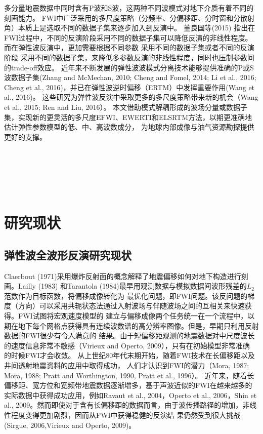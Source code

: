 多分量地震数据中同时含有P波和S波，这两种不同波模式对地下介质有着不同的刻画能力。
FWI中广泛采用的多尺度策略（分频率、分偏移距、分时窗和分散射角）本质上是选取不同的数据子集来逐步加入到反演中。
董良国等(2015)\cite{董良国2015}
指出在FWI过程中，不同的反演阶段采用不同的数据子集可以降低反演的非线性程度。而在弹性波反演中，更加需要根据不同参数
采用不同的数据子集或者不同的反演阶段
采用不同的数据子集，来降低多参数反演的非线性程度，同时也压制参数间的trade-off效应。
近年来不断发展的弹性波波模式分离技术能够提供准确的P或S波数据子集(Zhang and McMechan,
2010\cite{zhang.mcmechan:2010}; Cheng and Fomel,
2014\cite{cheng:2014b}; Li et al., 2016\cite{Li2016a}; Cheng et al.,
2016\cite{cheng:2016})，并已在弹性波逆时偏移（ERTM）中发挥重要作用(Wang et al.,
2016\cite{wang2016scalar})。
这些研究为弹性波反演中采取更多的多尺度策略带来新的机会（Wang et al., 2015\cite{wang:2015}; Ren and
Liu, 2016\cite{ren.liu:2016}）。
本文借助模式解耦形成的波场分量或数据子集，实现新的更灵活的多尺度EFWI、EWERTI和ELSRTM方法，以期更准确地估计弹性参数模型的低、中、高波数成分，
为地球内部成像与油气资源勘探提供更好的支撑。

$\quad$

$\quad$

$\quad$
\section{研究现状}
\subsection{弹性波全波形反演研究现状}
Claerbout
(1971\cite{Claerbout1971})采用爆炸反射面的概念解释了地震偏移如何对地下构造进行刻画。Lailly
(1983)\cite{lailly1983seismic}
和Tarantola (1984)\cite{tarantola1984}最早用观测数据与模拟数据间波形残差的$L_2$范数作为目标函数，将偏移成像转化为
最优化问题，即FWI问题。该反问题的梯度（方向）可以采用共轭状态法通过入射波场与伴随波场之间的互相关来快速获得。FWI试图将宏观速度模型的
建立与偏移成像两个任务统一在一个流程中，以期在地下每个网格点获得具有连续波数谱的高分辨率图像。但是，早期只利用反射数据的FWI很少有令人满意的
结果。由于短偏移距观测的地震数据对中尺度波长的速度信息非常不敏感（Virieux and Operto,
2009\cite{virieux2009overview}），只有在初始模型非常准确
的时候FWI才会收敛。
从上世纪80年代末期开始，随着FWI技术在长偏移距以及井间透射地震资料的应用中取得成功，
人们才认识到FWI的潜力（Mora, 1987\cite{mora:1987}; Mora, 1988\cite{mora1988elastic}; Pratt
and Worthington, 1990\cite{PRATTEtAl1990}, Pratt et al., 1996\cite{pratt1996two}）。
近年来，随着长偏移距、宽方位和宽频带地震数据逐渐增多，基于声波近似的FWI在越来越多的实际数据中获得成功应用，例如Ravaut
et al., 2004\cite{RavautEtAl2004}，Operto et al., 2006\cite{Operto2006}，Shin et al.,
2009\cite{ShinEtAl2009}。然而即使对于含有长偏移距的数据而言，由于波传播路径的增加，非线性程度变得更加剧烈，因而从FWI中获得稳健的反演结
果仍然受到很大挑战(Sirgue, 2006\cite{sirgue2006importance},Virieux and Operto,
2009\cite{virieux2009overview})。

